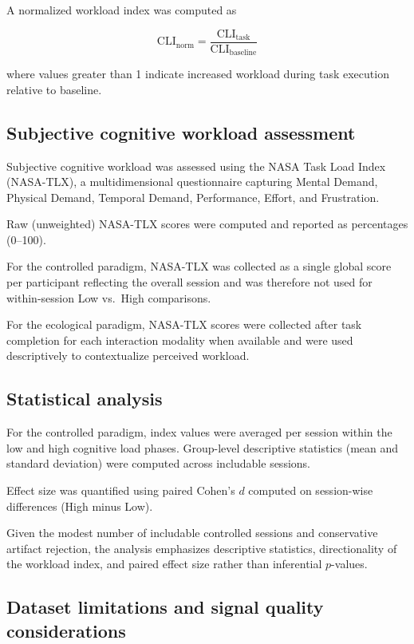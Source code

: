 \documentclass[10pt]{iopart}
\begin{document}
A normalized workload index was computed as

\begin{equation}
\mathrm{CLI}_{\mathrm{norm}} =
\frac{\mathrm{CLI}_{\mathrm{task}}}{\mathrm{CLI}_{\mathrm{baseline}}}
\label{eq:cli_norm}
\end{equation}

where values greater than 1 indicate increased workload during task execution relative to baseline.

\subsection{Subjective cognitive workload assessment}

Subjective cognitive workload was assessed using the NASA Task Load Index (NASA-TLX), a multidimensional questionnaire capturing Mental Demand, Physical Demand, Temporal Demand, Performance, Effort, and Frustration.

Raw (unweighted) NASA-TLX scores were computed and reported as percentages (0--100).

For the controlled paradigm, NASA-TLX was collected as a single global score per participant reflecting the overall session and was therefore not used for within-session Low vs.\ High comparisons.

For the ecological paradigm, NASA-TLX scores were collected after task completion for each interaction modality when available and were used descriptively to contextualize perceived workload.

\subsection{Statistical analysis}

For the controlled paradigm, index values were averaged per session within the low and high cognitive load phases. Group-level descriptive statistics (mean and standard deviation) were computed across includable sessions.

Effect size was quantified using paired Cohen's $d$ computed on session-wise differences (High minus Low).

Given the modest number of includable controlled sessions and conservative artifact rejection, the analysis emphasizes descriptive statistics, directionality of the workload index, and paired effect size rather than inferential $p$-values.

\subsection{Dataset limitations and signal quality considerations}
\end{document}
